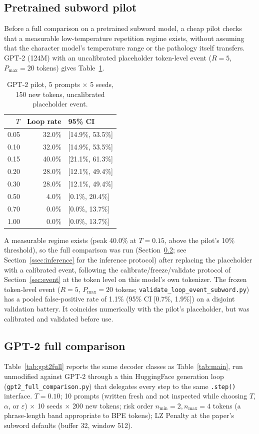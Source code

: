 \documentclass[11pt]{article}
\begin{document}
\subsection{Pretrained subword pilot}
Before a full comparison on a pretrained subword model, a cheap pilot checks that a measurable low-temperature repetition regime exists, without assuming that the character model's temperature range or the pathology itself transfers. GPT-2 (124M) with an uncalibrated placeholder token-level event ($R{=}5$, $P_{\max}{=}20$ tokens) gives Table~\ref{tab:gpt2pilot}.

\begin{table}[ht]
\centering
\caption{GPT-2 pilot, 5 prompts $\times$ 5 seeds, 150 new tokens, uncalibrated placeholder event.}
\label{tab:gpt2pilot}
\begin{tabular}{@{}rrl@{}}
\toprule
$T$ & Loop rate & 95\% CI \\
\midrule
0.05 & 32.0\% & [14.9\%, 53.5\%] \\
0.10 & 32.0\% & [14.9\%, 53.5\%] \\
0.15 & 40.0\% & [21.1\%, 61.3\%] \\
0.20 & 28.0\% & [12.1\%, 49.4\%] \\
0.30 & 28.0\% & [12.1\%, 49.4\%] \\
0.50 & 4.0\%  & [0.1\%, 20.4\%] \\
0.70 & 0.0\%  & [0.0\%, 13.7\%] \\
1.00 & 0.0\%  & [0.0\%, 13.7\%] \\
\bottomrule
\end{tabular}
\end{table}

A measurable regime exists (peak 40.0\% at $T{=}0.15$, above the pilot's 10\% threshold), so the full comparison was run (Section~\ref{sec:gpt2-full}; see Section~\ref{ssec:inference} for the inference protocol) after replacing the placeholder with a calibrated event, following the calibrate/freeze/validate protocol of Section~\ref{sec:event} at the token level on this model's own tokenizer. The frozen token-level event ($R{=}5$, $P_{\max}{=}20$ tokens; \texttt{validate\_\allowbreak{}loop\_\allowbreak{}event\_\allowbreak{}subword.py}) has a pooled false-positive rate of 1.1\% (95\% CI [0.7\%, 1.9\%]) on a disjoint validation battery. It coincides numerically with the pilot's placeholder, but was calibrated and validated before use.

\subsection{GPT-2 full comparison}
\label{sec:gpt2-full}
Table~\ref{tab:gpt2full} reports the same decoder classes as Table~\ref{tab:main}, run unmodified against GPT-2 through a thin HuggingFace generation loop (\texttt{gpt2\_\allowbreak{}full\_\allowbreak{}comparison.py}) that delegates every step to the same \texttt{.step()} interface. $T{=}0.10$; 10 prompts (written fresh and not inspected while choosing $T$, $\alpha$, or $\varepsilon$) $\times$ 10 seeds $\times$ 200 new tokens; risk order $n_{\min}{=}2,n_{\max}{=}4$ tokens (a phrase-length band appropriate to BPE tokens); LZ Penalty at the paper's subword defaults (buffer 32, window 512).
\end{document}
